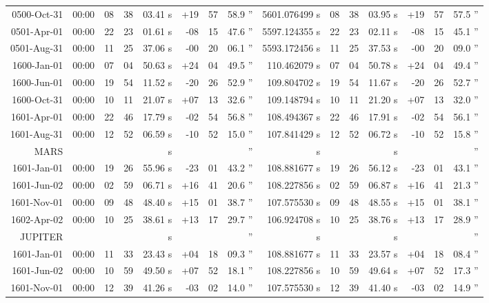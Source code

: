 \begin{longtable}{r@{\,}r|r@{h}r@{m}r<{s}|r@{°}r@{'}r<{''}|r<{s}||r@{h}r@{m}r<{s}|r@{°}r@{'}r<{''}}
 0500-Oct-31 &00:00   &  08 & 38 & 03.41 & +19 & 57 & 58.9  &  5601.076499 & 08&38&03.95 & +19&57&57.5 \\ %
 0501-Apr-01 &00:00   &  22 & 23 & 01.61 & -08 & 15 & 47.6  &  5597.124355 & 22&23&02.11 & -08&15&45.1 \\ %
 0501-Aug-31 &00:00   &  11 & 25 & 37.06 & -00 & 20 & 06.1  &  5593.172456 & 11&25&37.53 & -00&20&09.0 \\ %
 1600-Jan-01 &00:00   &  07 & 04 & 50.63 & +24 & 04 & 49.5  &   110.462079 & 07&04&50.78 & +24&04&49.4 \\ %
 1600-Jun-01 &00:00   &  19 & 54 & 11.52 & -20 & 26 & 52.9  &   109.804702 & 19&54&11.67 & -20&26&52.7 \\ %
 1600-Oct-31 &00:00   &  10 & 11 & 21.07 & +07 & 13 & 32.6  &   109.148794 & 10&11&21.20 & +07&13&32.0 \\ %
 1601-Apr-01 &00:00   &  22 & 46 & 17.79 & -02 & 54 & 56.8  &   108.494367 & 22&46&17.91 & -02&54&56.1 \\ %
 1601-Aug-31 &00:00   &  12 & 52 & 06.59 & -10 & 52 & 15.0  &   107.841429 & 12&52&06.72 & -10&52&15.8 \\ %
MARS\\ 
 1601-Jan-01 &00:00   &  19 & 26 & 55.96 & -23 & 01 & 43.2  &   108.881677 & 19&26&56.12 & -23&01&43.1 \\ %
 1601-Jun-02 &00:00   &  02 & 59 & 06.71 & +16 & 41 & 20.6  &   108.227856 & 02&59&06.87 & +16&41&21.3 \\ %
 1601-Nov-01 &00:00   &  09 & 48 & 48.40 & +15 & 01 & 38.7  &   107.575530 & 09&48&48.55 & +15&01&38.1 \\ %
 1602-Apr-02 &00:00   &  10 & 25 & 38.61 & +13 & 17 & 29.7  &   106.924708 & 10&25&38.76 & +13&17&28.9 \\ %
JUPITER\\ 
 1601-Jan-01 &00:00   &  11 & 33 & 23.43 & +04 & 18 & 09.3  &   108.881677 & 11&33&23.57 & +04&18&08.4 \\ %
 1601-Jun-02 &00:00   &  10 & 59 & 49.50 & +07 & 52 & 18.1  &   108.227856 & 10&59&49.64 & +07&52&17.3 \\ %
 1601-Nov-01 &00:00   &  12 & 39 & 41.26 & -03 & 02 & 14.0  &   107.575530 & 12&39&41.40 & -03&02&14.9 \\ %

\end{longtable}
